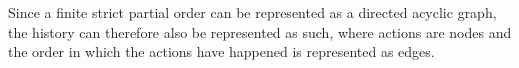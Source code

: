     \newpar Since a finite strict partial order can be represented as a directed acyclic graph, the history can therefore also be represented as such, where actions are nodes and the order in which the actions have happened is represented as edges.

	

	
	
%	
%	
%	
%	

